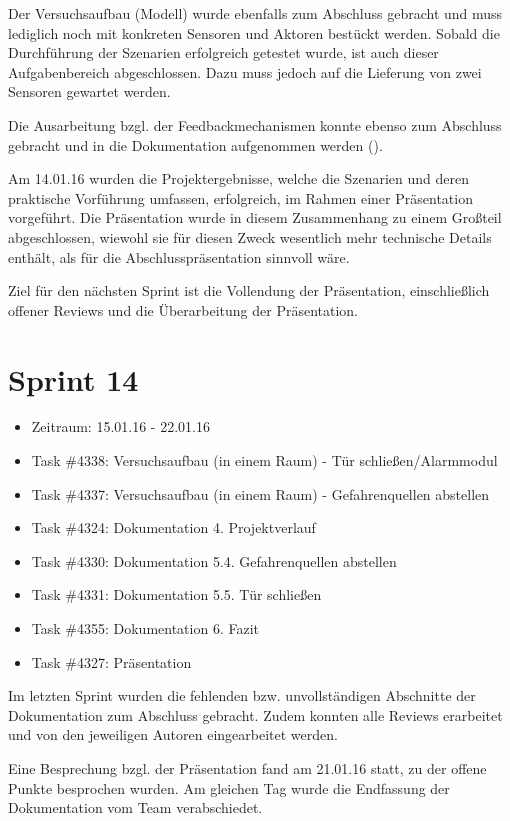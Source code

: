 \documentclass[12pt, oneside, smallheadings]{scrbook}
\begin{document}
Der Versuchsaufbau (Modell) wurde ebenfalls zum Abschluss gebracht und muss lediglich noch mit konkreten Sensoren und Aktoren bestückt werden. Sobald die Durchführung der Szenarien erfolgreich getestet wurde, ist auch dieser Aufgabenbereich abgeschlossen. Dazu muss jedoch auf die Lieferung von zwei Sensoren gewartet werden.

Die Ausarbeitung bzgl. der Feedbackmechanismen konnte ebenso zum Abschluss gebracht und in die Dokumentation aufgenommen werden ().

Am 14.01.16 wurden die Projektergebnisse, welche die Szenarien und deren praktische Vorführung umfassen, erfolgreich, im Rahmen einer Präsentation vorgeführt. Die Präsentation wurde in diesem Zusammenhang zu einem Großteil abgeschlossen, wiewohl sie für diesen Zweck wesentlich mehr technische Details enthält, als für die Abschlusspräsentation sinnvoll wäre.

Ziel für den nächsten Sprint ist die Vollendung der Präsentation, einschließlich offener Reviews und die Überarbeitung der Präsentation.

\section{Sprint 14}
\begin{itemize}
	\item Zeitraum: 15.01.16 - 22.01.16 \newline
	\item Task \#4338: Versuchsaufbau (in einem Raum) - Tür schließen/Alarmmodul
	\item Task \#4337: Versuchsaufbau (in einem Raum) - Gefahrenquellen abstellen
	\item Task \#4324: Dokumentation 4. Projektverlauf
	\item Task \#4330: Dokumentation 5.4. Gefahrenquellen abstellen
	\item Task \#4331: Dokumentation 5.5. Tür schließen
	\item Task \#4355: Dokumentation 6. Fazit
	\item Task \#4327: Präsentation\\
\end{itemize}
\noindent
Im letzten Sprint wurden die fehlenden bzw. unvollständigen Abschnitte der Dokumentation zum Abschluss gebracht. Zudem konnten alle Reviews erarbeitet und von den jeweiligen Autoren eingearbeitet werden.

Eine Besprechung bzgl. der Präsentation fand am 21.01.16 statt, zu der offene Punkte besprochen wurden. Am gleichen Tag wurde die Endfassung der Dokumentation vom Team verabschiedet.
\end{document}
